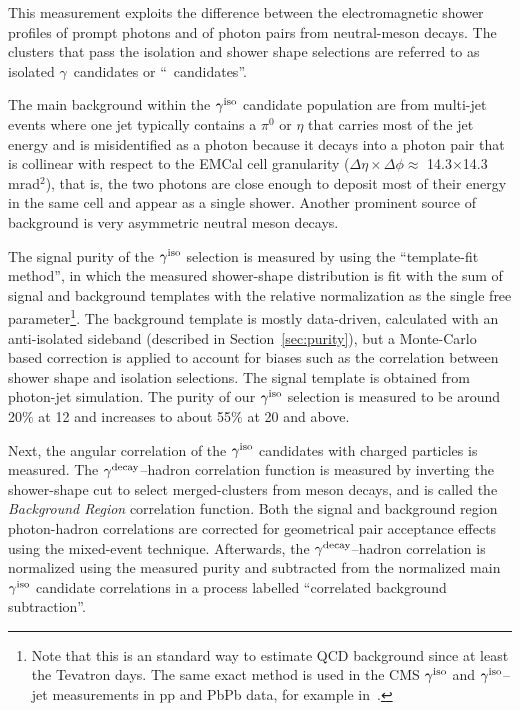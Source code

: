 This measurement exploits the difference between the electromagnetic shower profiles of prompt photons and of photon pairs from neutral-meson decays. The clusters that pass the isolation and shower shape selections are referred to as isolated $\gamma$~candidates or ``\gammaiso~candidates''. 

The main background within the $\gamma^\mathrm{iso}$ candidate population are from multi-jet events where one jet typically contains a $\pi^{0}$ or $\eta$ that carries most of the jet energy and is misidentified as a photon because it decays into a photon pair that is collinear with respect to the EMCal cell granularity ($\Delta\eta\times\Delta\phi\approx$  14.3$\times$14.3 mrad$^{2}$), that is, the two photons are close enough to deposit most of their energy in the same cell and appear as a single shower. Another prominent source of background is very asymmetric neutral meson decays.

The signal purity of the $\gamma^\mathrm{iso}$ selection is measured by using the ``template-fit method'', in which the measured shower-shape distribution is fit with the sum of signal and background templates with the relative normalization as the single free parameter\footnote{Note that this is an standard way to estimate QCD background since at least the Tevatron days. The same exact method is used in the CMS $\gamma^\mathrm{iso}$ and $\gamma^\mathrm{iso}$--jet measurements in pp and PbPb data, for example in~\cite{Sirunyan:2018gro,Chatrchyan:2012gt}.}. The background template is mostly data-driven, calculated with an anti-isolated sideband (described in Section~\ref{sec:purity}), but a Monte-Carlo based correction is applied to account for biases such as the correlation between shower shape and isolation selections. The signal template is obtained from photon-jet simulation. The purity of our $\gamma^\mathrm{iso}$ selection is measured to be around 20$\%$ at {12 \GeVc} and increases to about 55$\%$ at {20 \GeVc} and above. 

Next, the angular correlation of the $\gamma^\mathrm{iso}$ candidates with charged particles is measured.  The {$\gamma^\mathrm{decay}$--hadron} correlation function is measured by inverting the shower-shape cut to select merged-clusters from meson decays, and is called the \textit{Background Region} correlation function. Both the signal and background region photon-hadron correlations are corrected for geometrical pair acceptance effects using the mixed-event technique. Afterwards, the $\gamma^\mathrm{decay}$--hadron correlation is normalized using the measured purity and subtracted from the normalized main $\gamma^\mathrm{iso}$ candidate correlations in a process labelled ``correlated background subtraction''.

